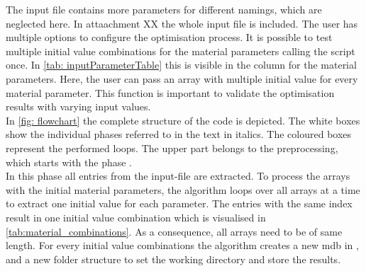 The input file contains more parameters for different namings, which are neglected here. In attaachment XX the whole input file is included. 
The user has multiple options to configure the optimisation process. It is possible to test multiple initial value combinations for the material parameters calling the script once. In \autoref{tab: inputParameterTable} this is visible in the column  for the material parameters.
Here, the user can pass an array with multiple initial value for every material parameter.
This function is important to validate the optimisation results with varying input values. \\
\indent In \autoref{fig: flowchart} the complete structure of the code is depicted. The white boxes show the individual phases referred to in the text in italics. The coloured boxes represent the performed loops. 
The upper part belongs to the preprocessing, which starts with the phase . \\
\indent In this phase all entries from the input-file are extracted. 
To process the arrays with the initial material parameters, the algorithm loops over all arrays at a time to extract one initial value for each parameter.
The entries with the same index result in one initial value combination which is visualised in \autoref{tab:material_combinations}.
As a consequence, all arrays need to be of same length. For every initial value combinations the algorithm creates a new \acrfull{mdb} in , and a new folder structure to set the working directory and store the results.

